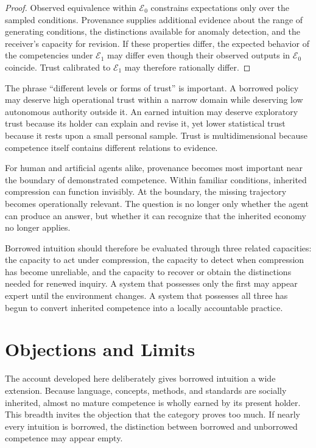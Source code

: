 \documentclass[11pt]{article}
\begin{document}
\begin{proof}
Observed equivalence within $\mathcal{E}_0$ constrains expectations only over the sampled conditions. Provenance supplies additional evidence about the range of generating conditions, the distinctions available for anomaly detection, and the receiver's capacity for revision. If these properties differ, the expected behavior of the competencies under $\mathcal{E}_1$ may differ even though their observed outputs in $\mathcal{E}_0$ coincide. Trust calibrated to $\mathcal{E}_1$ may therefore rationally differ.
\end{proof}

The phrase ``different levels or forms of trust'' is important. A borrowed policy may deserve high operational trust within a narrow domain while deserving low autonomous authority outside it. An earned intuition may deserve exploratory trust because its holder can explain and revise it, yet lower statistical trust because it rests upon a small personal sample. Trust is multidimensional because competence itself contains different relations to evidence.

For human and artificial agents alike, provenance becomes most important near the boundary of demonstrated competence. Within familiar conditions, inherited compression can function invisibly. At the boundary, the missing trajectory becomes operationally relevant. The question is no longer only whether the agent can produce an answer, but whether it can recognize that the inherited economy no longer applies.

Borrowed intuition should therefore be evaluated through three related capacities: the capacity to act under compression, the capacity to detect when compression has become unreliable, and the capacity to recover or obtain the distinctions needed for renewed inquiry. A system that possesses only the first may appear expert until the environment changes. A system that possesses all three has begun to convert inherited competence into a locally accountable practice.

\section{Objections and Limits}

The account developed here deliberately gives borrowed intuition a wide extension. Because language, concepts, methods, and standards are socially inherited, almost no mature competence is wholly earned by its present holder. This breadth invites the objection that the category proves too much. If nearly every intuition is borrowed, the distinction between borrowed and unborrowed competence may appear empty.
\end{document}
